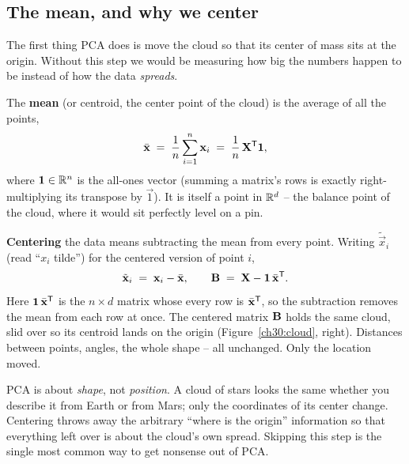 \subsection{The mean, and why we center}

The first thing PCA does is move the cloud so that its center of mass sits at the
origin. Without this step we would be measuring how big the numbers happen to be
instead of how the data \emph{spreads}.

The \textbf{mean} (or centroid, the center point of the cloud) is the average of all the points,
\[
  \bar{\mathbf{x}} \;=\; \frac{1}{n}\sum_{i=1}^{n}\mathbf{x}_i
  \;=\;\frac{1}{n}\,\mathbf{X}^{\mathsf{T}}\mathbf{1},
\]
where $\mathbf{1}\in\mathbb{R}^n$ is the all-ones vector (summing a matrix's rows is exactly
right-multiplying its transpose by $\vec 1$). It is itself a point in $\mathbb{R}^d$ -- the
balance point of the cloud, where it would sit perfectly level on a pin.

\textbf{Centering} the data means subtracting the mean from every point. Writing
$\tilde{\vec x}_i$ (read ``$x_i$ tilde'') for the centered version of point $i$,
\[
  \tilde{\mathbf{x}}_i \;=\; \mathbf{x}_i - \bar{\mathbf{x}},
  \qquad
  \mathbf{B} \;=\; \mathbf{X} - \mathbf{1}\,\bar{\mathbf{x}}^{\mathsf{T}}.
\]
Here $\mathbf{1}\,\bar{\mathbf{x}}^{\mathsf{T}}$ is the $n\times d$ matrix whose every row is
$\bar{\mathbf{x}}^{\mathsf{T}}$, so the subtraction removes the mean from each row at once. The
centered matrix $\mathbf{B}$ holds the same cloud, slid over so its centroid
lands on the origin (Figure~\ref{ch30:cloud}, right). Distances between points, angles, the whole shape -- all
unchanged. Only the location moved.

\begin{intuitionbox}
PCA is about \emph{shape}, not \emph{position}. A cloud of stars looks the same
whether you describe it from Earth or from Mars; only the coordinates of its center
change. Centering throws away the arbitrary ``where is the origin'' information so
that everything left over is about the cloud's own spread. Skipping this step
is the single most common way to get nonsense out of PCA.
\end{intuitionbox}

